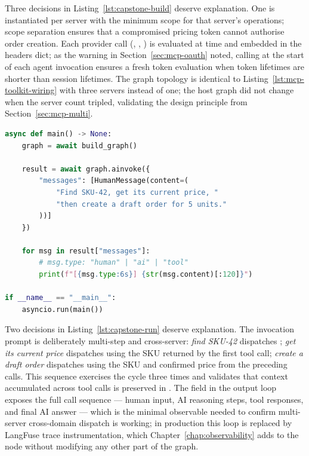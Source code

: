 Three decisions in Listing~\ref{lst:capstone-build} deserve explanation.
One  is instantiated per server with the
minimum scope for that server's operations; scope separation ensures
that a compromised pricing token cannot authorise order creation.
Each provider call (, , )
is evaluated at  time and embedded in the headers
dict; as the warning in Section~\ref{sec:mcp-oauth} noted, calling
 at the start of each agent invocation ensures
a fresh token evaluation when token lifetimes are shorter than session
lifetimes. The graph topology is identical to Listing~\ref{lst:mcp-toolkit-wiring}
with three servers instead of one; the host graph did not change when
the server count tripled, validating the design principle from
Section~\ref{sec:mcp-multi}.

\begin{lstlisting}[language=Python,
                   caption={Capstone agent: entry point and invocation
                            (ch16/agent/capstone\_agent.py, part~2)},
                   label={lst:capstone-run}]
async def main() -> None:
    graph = await build_graph()

    result = await graph.ainvoke({
        "messages": [HumanMessage(content=(
            "Find SKU-42, get its current price, "
            "then create a draft order for 5 units."
        ))]
    })

    for msg in result["messages"]:
        # msg.type: "human" | "ai" | "tool"
        print(f"[{msg.type:6s}] {str(msg.content)[:120]}")

if __name__ == "__main__":
    asyncio.run(main())
\end{lstlisting}

Two decisions in Listing~\ref{lst:capstone-run} deserve explanation.
The invocation prompt is deliberately multi-step and cross-server:
\emph{find SKU-42} dispatches ;
\emph{get its current price} dispatches 
using the SKU returned by the first tool call; \emph{create a draft
order} dispatches  using the SKU
and confirmed price from the preceding calls. This sequence exercises
the  cycle three times and validates
that context accumulated across tool calls is preserved in
. The  field in the output loop
exposes the full call sequence --- human input, AI reasoning steps,
tool responses, and final AI answer --- which is the minimal observable
needed to confirm multi-server cross-domain dispatch is working;
in production this loop is replaced by LangFuse trace instrumentation,
which Chapter~\ref{chap:observability} adds to the 
node without modifying any other part of the graph.

